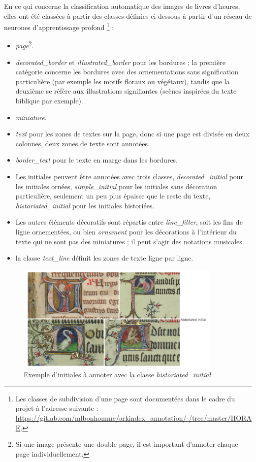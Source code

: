 \documentclass[a4paper,12pt,twoside]{book}
\begin{document}
    En ce qui concerne la classification automatique des images de livres d'heures, elles ont été classées à partir des classes définies ci-dessous à partir d'un réseau de neurones d'apprentissage profond \footnote{Les classes de subdivision d'une page sont documentées dans le cadre du projet à l'adresse suivante : \url{https://gitlab.com/mlbonhomme/arkindex_annotation/-/tree/master/HORAE}.} :
	\begin{itemize}
	    \item \textit{page}\footnote{Si une image présente une double page, il est important d'annoter chaque page individuellement.}.
	    \item \textit{decorated\_border} et \textit{illustrated\_border} pour les bordures ; la première catégorie concerne les bordures avec des ornementations sans signification particulière (par exemple les motifs floraux ou végétaux), tandis que la deuxième se réfère aux illustrations signifiantes (scènes inspirées du texte biblique par exemple).
	    \item \textit{miniature}.
	    \item \textit{text} pour les zones de textes sur la page, donc si une page est divisée en deux colonnes, deux zones de texte sont annotées.
	    \item \textit{border\_text} pour le texte en marge dans les bordures.
	    \item Les initiales peuvent être annotées avec trois classes, \textit{decorated\_initial} pour les initiales ornées, \textit{simple\_initial} pour les initiales sans décoration particulière, seulement un peu plus épaisse que le reste du texte, \textit{historiated\_initial} pour les initiales historiées. 
	    \item Les autres éléments décoratifs sont répartis entre \textit{line\_filler}, soit les fins de ligne ornementées, ou bien \textit{ornament} pour les décorations à l'intérieur du texte qui ne sont pas des miniatures ; il peut s'agir des notations musicales.
	    \item la classe \textit{text\_line} définit les zones de texte ligne par ligne.
	\end{itemize}
	
	\begin{figure}[!h]
    \centering
    \includegraphics[width=10cm]{img/ML/historiated_initial.png}
    \caption{Exemple d'initiales à annoter avec la classe \textit{historiated\_initial}}
    \end{figure}
    
\end{document}

